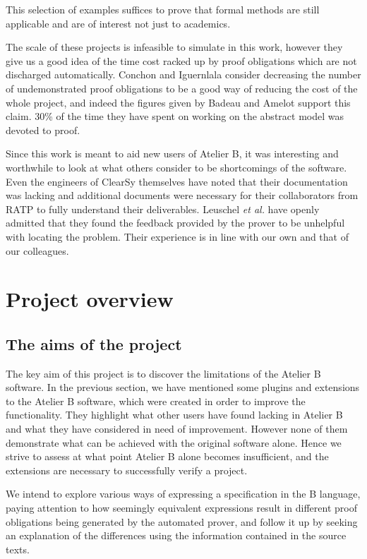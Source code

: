 \documentclass[11pt,journal]{IEEEtran}
\begin{document}
	This selection of examples suffices to prove that formal methods are still applicable and are of interest not just to academics. 
	
	The scale of these projects is infeasible to simulate in this work, however they give us a good idea of the time cost racked up by proof obligations which are not discharged automatically. Conchon and Iguernlala consider decreasing the number of undemonstrated proof obligations to be a good way of reducing the cost of the whole project\cite{survey}, and indeed the figures given by Badeau and Amelot support this claim. 30\% of the time they have spent on working on the abstract model was devoted to proof\cite{airport shuttle}.
	
	Since this work is meant to aid new users of Atelier B, it was interesting and worthwhile to look at what others consider to be shortcomings of the software. Even the engineers of ClearSy themselves have noted that their documentation was lacking and additional documents were necessary for their collaborators from RATP to fully understand their deliverables\cite{screen doors}. Leuschel \emph{et al.} have openly admitted that they found the feedback provided by the prover to be unhelpful with locating the problem\cite{San Juan metro}. Their experience is in line with our own and that of our colleagues.

	\section{Project overview}
	\subsection{The aims of the project}
	The key aim of this project is to discover the limitations of the Atelier B software. In the previous section, we have mentioned some plugins and extensions to the Atelier B software, which were created in order to improve the functionality. They highlight what other users have found lacking in Atelier B and what they have considered in need of improvement. However none of them demonstrate what can be achieved with the original software alone. Hence we strive to assess at what point Atelier B alone becomes insufficient, and the extensions are necessary to successfully verify a project. 
		
	We intend to explore various ways of expressing a specification in the B language, paying attention to how seemingly equivalent expressions result in different proof obligations being generated by the automated prover, and follow it up by seeking an explanation of the differences using the information contained in the source texts. 
	
\end{document}

